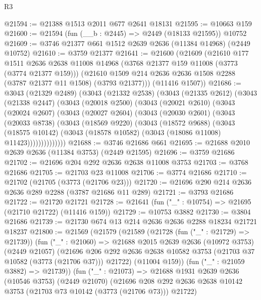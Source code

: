\begin{lexlean}{R3}
\begin{coremodule}
@21594 := @21388 @1513 @2011 @677 @2641 @18131
@21595 := @10663 @159
@21600 := @21594 (fun (__b : @2445) => @2449 (@18133 @21595)) @10752
@21609 := @3746 @21377 @661 @1512 @2639 @2636 (@11384 @14968) (@2449 @10752)
@21610 := @3759 @21377
@21641 := @21600
    (@21609
      (@21610
        @177
        @1511
        @2636
        @2638
        @11008
        @14968
        (@3768 @21377 @159 @11008 (@3773 (@3774 @21377 @159)))
        (@21610 @1509 @214 @2636 @2636 @1508 @2288 (@3787 @21377 @11 @1508) (@3793 @21377)))
      (@11416 @1507))
@21686 := @3043
    (@21329 @2489)
    (@3043
      (@21332 @2538)
      (@3043
        (@21335 @2612)
        (@3043
          (@21338 @2447)
          (@3043
            (@20018 @2500)
            (@3043
              (@20021 @2610)
              (@3043
                (@20024 @2607)
                (@3043
                  (@20027 @2604)
                  (@3043
                    (@20030 @2601)
                    (@3043
                      (@20033 @8738)
                      (@3043
                        (@18569 @9220)
                        (@3043
                          (@18572 @9688)
                          (@3043
                            (@18575 @10142)
                            (@3043 (@18578 @10582) (@3043 (@18086 @11008) @11423))))))))))))))
@21688 := @3746 @21686 @661
@21695 := @21688 @2010 @2639 @2636 (@11384 @3753) (@2449 @21595)
@21696 := @3759 @21686
@21702 := @21696 @204 @292 @2636 @2638 @11008 @3753
@21703 := @3768 @21686
@21705 := @21703 @23 @11008
@21706 := @3774 @21686
@21710 := @21702 (@21705 (@3773 (@21706 @23)))
@21720 := @21696 @290 @214 @2636 @2636 @289 @2288 (@3787 @21686 @11 @289)
@21721 := @3793 @21686
@21722 := @21720 @21721
@21728 := @21641 (fun ("_" : @10754) => @21695 (@21710 @21722) (@11416 @159))
@21729 := @10753 @3882
@21730 := @3804 @21686
@21739 := @21730 @674 @13 @214 @2636 @2636 @2288 @18234 @21721 @18237
@21800 := @21569
    (@21579
      (@21589
        (@21728 (fun ("_" : @21729) => @21739))
        (fun ("_" : @21060) =>
        @21688
          @2015
          @2639
          @2636
          (@10972 @3753)
          (@2449 @21057)
          (@21696
            @206
            @292
            @2636
            @2638
            @10582
            @3753
            (@21703 @37 @10582 (@3773 (@21706 @37)))
            @21722)
          (@11004 @159))
        (fun ("_" : @21059 @3882) => @21739))
      (fun ("_" : @21073) =>
      @21688
        @1931
        @2639
        @2636
        (@10546 @3753)
        (@2449 @21070)
        (@21696 @208 @292 @2636 @2638 @10142 @3753 (@21703 @73 @10142 (@3773 (@21706 @73))) @21722)

\end{coremodule}
\end{lexlean}
